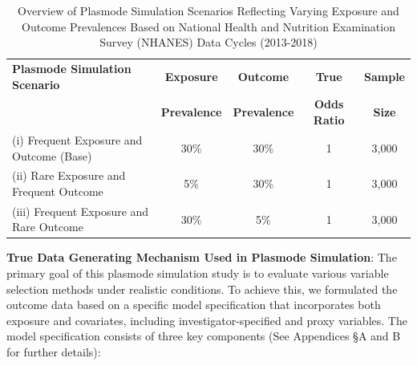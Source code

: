 \documentclass[10pt,letterpaper]{article}
\begin{document}
\begin{table}[ht]
\centering
\caption{Overview of Plasmode Simulation Scenarios Reflecting Varying Exposure and Outcome Prevalences Based on National Health and Nutrition Examination Survey (NHANES) Data Cycles (2013-2018)}
\label{table:scenarios}
\begin{tabular}{p{3cm}cccc}
  \toprule
  \textbf{Plasmode Simulation Scenario} & \textbf{Exposure} & \textbf{Outcome} & \textbf{True} & \textbf{Sample}\\
  \textbf{} & \textbf{Prevalence} & \textbf{Prevalence} & \textbf{Odds Ratio} & \textbf{Size}\\
  \midrule
  (i) Frequent Exposure and Outcome (Base) & 30\% & 30\% & 1 & 3,000 \\
  (ii) Rare Exposure and Frequent Outcome & 5\% & 30\% & 1 & 3,000 \\
  (iii) Frequent Exposure and Rare Outcome & 30\% & 5\% & 1 & 3,000 \\
  \bottomrule
\end{tabular}
\end{table}

\textbf{True Data Generating Mechanism Used in Plasmode Simulation}: The
primary goal of this plasmode simulation study is to evaluate various
variable selection methods under realistic conditions. To achieve this,
we formulated the outcome data based on a specific model specification
that incorporates both exposure and covariates, including
investigator-specified and proxy variables. The model specification
consists of three key components (See Appendices \S A and B for further
details):
\end{document}
